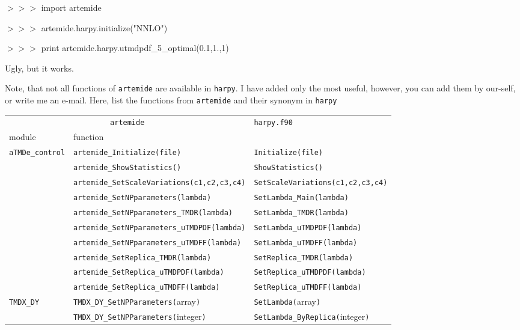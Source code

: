 \documentclass[prd,nofootinbib,eqsecnum,final]{revtex4}
\renewcommand{\(}{\left(}
\renewcommand{\)}{\right)}
\renewcommand{\[}{\left[}
\renewcommand{\]}{\right]}
\begin{document}
$>>>$ import artemide

$>>>$ artemide.harpy.initialize("NNLO")

$>>>$ print artemide.harpy.utmdpdf\_5\_optimal(0.1,1.,1)

Ugly, but it works.

Note, that not all functions of \texttt{artemide} are available in \texttt{harpy}. I have added only the most useful, however, you can add them by our-self, or write me an e-mail. Here, list the functions from \texttt{artemide} and their synonym in \texttt{harpy}

\begin{center}

\small
\begin{longtable}{|l|l||p{6cm}|}
\multicolumn{2}{|c||}{\texttt{artemide}} & \texttt{harpy.f90} 
\\
module & function & \\
\hline\hline
\texttt{aTMDe\_control} & \texttt{artemide\_Initialize(file)} & \texttt{Initialize(file)} 
\\\cline{2-3}
& \texttt{artemide\_ShowStatistics()} & \texttt{ShowStatistics()} 
\\\cline{2-3}
& \texttt{artemide\_SetScaleVariations(c1,c2,c3,c4)} & \texttt{SetScaleVariations(c1,c2,c3,c4)} 
\\\cline{2-3}
& \texttt{artemide\_SetNPparameters(lambda)} & \texttt{SetLambda\_Main(lambda)}
\\\cline{2-3}
& \texttt{artemide\_SetNPparameters\_TMDR(lambda)} & \texttt{SetLambda\_TMDR(lambda)}
\\\cline{2-3}
& \texttt{artemide\_SetNPparameters\_uTMDPDF(lambda)} & \texttt{SetLambda\_uTMDPDF(lambda)} 
\\\cline{2-3}
& \texttt{artemide\_SetNPparameters\_uTMDFF(lambda)} & \texttt{SetLambda\_uTMDFF(lambda)}
\\\cline{2-3}
& \texttt{artemide\_SetReplica\_TMDR(lambda)} & \texttt{SetReplica\_TMDR(lambda)}
\\\cline{2-3}
& \texttt{artemide\_SetReplica\_uTMDPDF(lambda)} & \texttt{SetReplica\_uTMDPDF(lambda)}
\\\cline{2-3}
& \texttt{artemide\_SetReplica\_uTMDFF(lambda)} & \texttt{SetReplica\_uTMDFF(lambda)}
\\\hline
\texttt{TMDX\_DY} & \texttt{TMDX\_DY\_SetNPParameters(}array\texttt{)} & \texttt{SetLambda(}array\texttt{)} 
\\\cline{2-3}
& \texttt{TMDX\_DY\_SetNPParameters(}integer\texttt{)} & \texttt{SetLambda\_ByReplica(}integer\texttt{)} 

\end{longtable}
\end{center}
\end{document}

